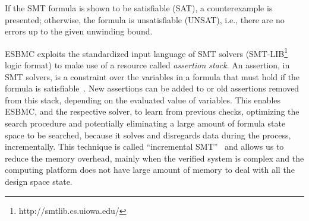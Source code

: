 \documentclass[journal]{IEEEtran}
\begin{document}
%
If the SMT formula is shown to be satisfiable (SAT), a counterexample is presented; otherwise, the formula is unsatisfiable (UNSAT), i.e., there are no errors up to the given unwinding bound. 

ESBMC exploits the standardized input language of SMT solvers (SMT-LIB\footnote{http://smtlib.cs.uiowa.edu/} logic format) to make use of a resource called \textit{assertion stack}. An assertion, in SMT solvers, is a constraint over the variables in a formula that must hold if the formula is satisfiable~\cite{Morse2015}. New assertions can be added to or old assertions removed from this stack, depending on the evaluated value of variables. This enables ESBMC, and the respective solver, to learn from previous checks, optimizing the search procedure and potentially eliminating a large amount of formula state space to be searched, because it solves and disregards data during the process, incrementally. This technique is called ``incremental SMT''~\cite{DBLP:journals/fac/SchrammelKBMTB17} and allows us to reduce the memory overhead, mainly when the verified system is complex and the computing platform does not have large amount of memory to deal with all the design space state.

%
%
 
\end{document}
